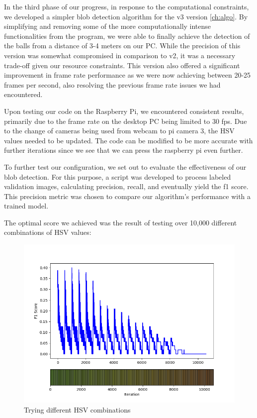 In the third phase of our progress, in response to the computational constraints, we developed a simpler blob detection algorithm for the v3 version \ref{ch:algo}. By simplifying and removing some of the more computationally intense functionalities from the program, we were able to finally achieve the detection of the balls from a distance of 3-4 meters on our PC. While the precision of this version was somewhat compromised in comparison to v2, it was a necessary trade-off given our resource constraints. This version also offered a significant improvement in frame rate performance as we were now achieving between 20-25    frames per second, also resolving the previous frame rate issues we had encountered.

Upon testing our code on the Raspberry Pi, we encountered consistent results, primarily due to the frame rate on the desktop PC being limited to 30 fps. Due to the change of cameras being used from webcam to pi camera 3, the HSV values needed to be updated. The code can be modified to be more accurate with further iterations since we see that we can press the raspberry pi even further. 

To further test our configuration, we set out to evaluate the effectiveness of our blob detection. For this purpose, a script was developed to process labeled validation images, calculating precision, recall, and eventually yield the f1 score. This precision metric was chosen to compare our algorithm's performance with a trained model.

The optimal score we achieved was the result of testing over 10,000 different combinations of HSV values:

\begin{figure}[h!]
\centering
\includegraphics[scale=0.75]{sindrebilder/HSVfinal.png}
\caption{Trying different HSV combinations}
\label{fig:evaluationTest4}
\end{figure}

